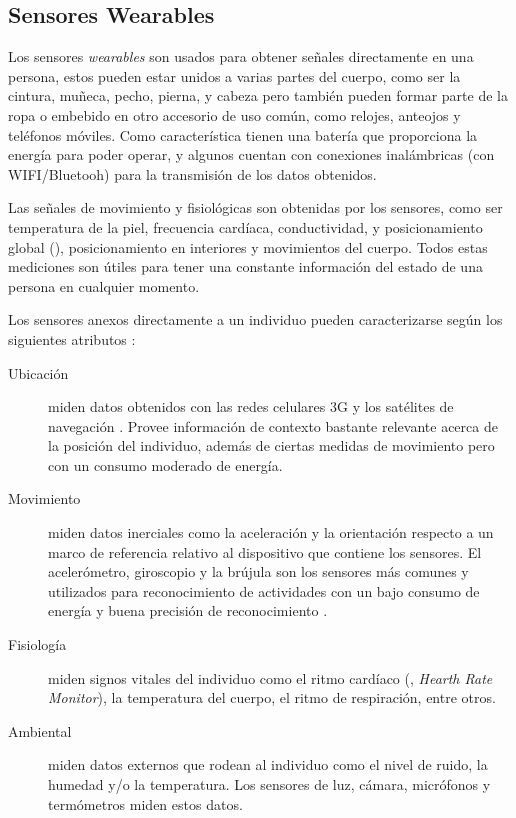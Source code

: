 \subsection{Sensores Wearables}

Los sensores \emph{wearables} son usados para obtener señales directamente
en una persona, estos pueden estar unidos a varias partes del cuerpo,
como ser la cintura, muñeca, pecho, pierna, y cabeza \cite{Bao2004}
pero también pueden formar parte de la ropa o embebido en otro accesorio
de uso común, como relojes, anteojos y teléfonos móviles. Como característica
tienen una batería que proporciona la energía para poder operar, y
algunos cuentan con conexiones inalámbricas (con WIFI/Bluetooh) para
la transmisión de los datos obtenidos.

Las señales de movimiento y fisiológicas son obtenidas por los sensores,
como ser temperatura de la piel, frecuencia cardíaca, conductividad,
y posicionamiento global (), posicionamiento en interiores
y movimientos del cuerpo. Todos estas mediciones son útiles para tener
una constante información del estado de una persona en cualquier momento.

Los sensores anexos directamente a un individuo pueden caracterizarse
según los siguientes atributos \cite{LaraLabrador2013}:
\begin{description}
\item [{Ubicación}] miden datos obtenidos con las redes celulares 3G y
los satélites de navegación . Provee información de contexto
bastante relevante acerca de la posición del individuo, además de
ciertas medidas de movimiento pero con un consumo moderado de energía.
\item [{Movimiento}] miden datos inerciales como la aceleración y la orientación
respecto a un marco de referencia relativo al dispositivo que contiene
los sensores. El acelerómetro, giroscopio y la brújula son los sensores
más comunes y utilizados para reconocimiento de actividades con un
bajo consumo de energía y buena precisión de reconocimiento \cite{Bao2004,LaraLabrador2012}.
\item [{Fisiología}] miden signos vitales del individuo como el ritmo cardíaco
(, \emph{Hearth Rate Monitor}), la temperatura del cuerpo,
el ritmo de respiración, entre otros.
\item [{Ambiental}] miden datos externos que rodean al individuo como el
nivel de ruido, la humedad y/o la temperatura. Los sensores de luz,
cámara, micrófonos y termómetros miden estos datos. 
\end{description}

